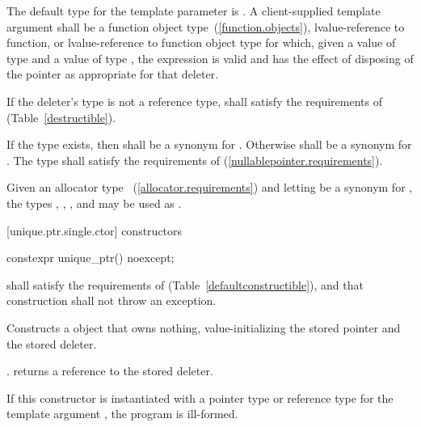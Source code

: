 \pnum
The default type for the template parameter  is
. A client-supplied template argument
 shall be a function
object type~(\ref{function.objects}), lvalue-reference to function, or
lvalue-reference to function object type
for which, given
a value  of type  and a value
 of type , the expression
 is valid and has the effect of disposing of the
pointer as appropriate for that deleter.

\pnum
If the deleter's type  is not a reference type,  shall satisfy
the requirements of  (Table~\ref{destructible}).

\pnum
If the type  exists, then  shall be a synonym for . Otherwise
 shall be a synonym for . The type  shall
satisfy the requirements of  (\ref{nullablepointer.requirements}).

\pnum
\enterexample Given an allocator type ~(\ref{allocator.requirements}) and
letting  be a synonym for , the types ,
, , and 
may be used as . \exitexample

[unique.ptr.single.ctor]{ constructors}

\begin{itemdecl}
constexpr unique_ptr() noexcept;
\end{itemdecl}

\begin{itemdescr}
\pnum
\requires {} shall
satisfy the requirements of  (Table~\ref{defaultconstructible}),
and that construction shall not throw an exception.

\pnum
\effects Constructs a  object that owns
nothing, value-initializing the stored pointer and the stored deleter.

\pnum
\postconditions {}. 
returns a reference to the stored deleter.

\pnum
\notes If this constructor is instantiated with a pointer type or reference type
for the template argument , the program is ill-formed.
\end{itemdescr}

